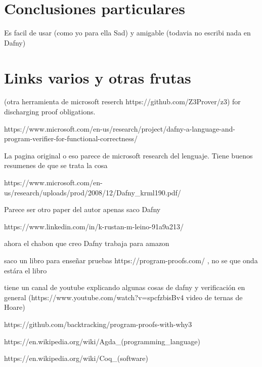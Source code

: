 \documentclass[runningheads]{llncs}
\begin{document}
\section{Conclusiones particulares}
Es facil de usar (como yo para ella Sad) y amigable (todavia no escribi nada en Dafny)

\section{Links varios y otras frutas}
(otra herramienta de microsoft reserch https://github.com/Z3Prover/z3) for discharging proof obligations.

https://www.microsoft.com/en-us/research/project/dafny-a-language-and-program-verifier-for-functional-correctness/

La pagina original o eso parece de microsoft research del lenguaje. Tiene buenos resumenes de que se trata la cosa

https://www.microsoft.com/en-us/research/uploads/prod/2008/12/Dafny\_krml190.pdf/

Parece ser otro paper del autor apenas saco Dafny

https://www.linkedin.com/in/k-rustan-m-leino-91a9a213/

ahora el chabon que creo Dafny trabaja para amazon

saco un libro para enseñar pruebas https://program-proofs.com/ , no se que onda estára el libro

tiene un canal de youtube explicando algunas cosas de dafny y verificación en general (https://www.youtube.com/watch?v=spcfzbisBv4 video de ternas de Hoare)

https://github.com/backtracking/program-proofs-with-why3

https://en.wikipedia.org/wiki/Agda_(programming_language)

https://en.wikipedia.org/wiki/Coq_(software)
\end{document}
